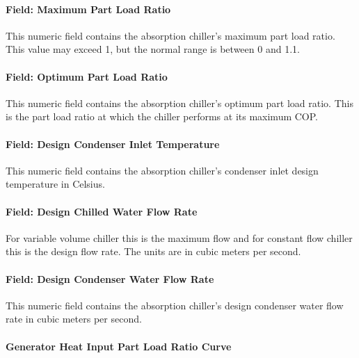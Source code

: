 \paragraph{Field: Maximum Part Load Ratio}\label{field-maximum-part-load-ratio-001}

This numeric field contains the absorption chiller's maximum part load ratio. This value may exceed 1, but the normal range is between 0 and 1.1.

\paragraph{Field: Optimum Part Load Ratio}\label{field-optimum-part-load-ratio-001}

This numeric field contains the absorption chiller's optimum part load ratio. This is the part load ratio at which the chiller performs at its maximum COP.

\paragraph{Field: Design Condenser Inlet Temperature}\label{field-design-condenser-inlet-temperature}

This numeric field contains the absorption chiller's condenser inlet design temperature in Celsius.

\paragraph{Field: Design Chilled Water Flow Rate}\label{field-design-chilled-water-flow-rate}

For variable volume chiller this is the maximum flow and for constant flow chiller this is the design flow rate. The units are in cubic meters per second.

\paragraph{Field: Design Condenser Water Flow Rate}\label{field-design-condenser-water-flow-rate}

This numeric field contains the absorption chiller's design condenser water flow rate in cubic meters per second.

\paragraph{Generator Heat Input Part Load Ratio Curve}\label{generator-heat-input-part-load-ratio-curve}

